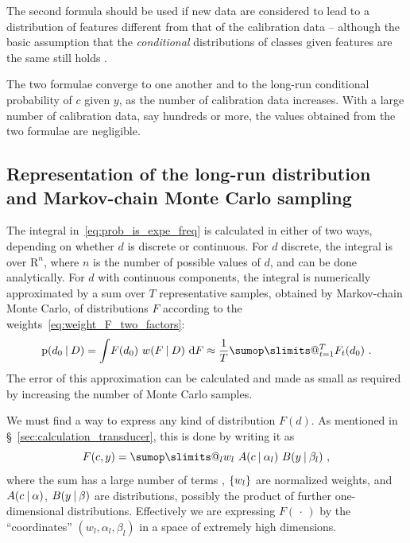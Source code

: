 \documentclass[\ifafour a4paper,12pt,\else a5paper,10pt,\fi%
onecolumn,oneside,article,%
british%
]{memoir}
\makeatletter
\theoremstyle{remark}
\theoremstyle{innote}
\def\sum{\DOTSI\sumop\slimits@}
\newcommand*{\wrench}{{\fontencoding{U}\fontfamily{fontawesomethree}\selectfont\symbol{114}}}
\newcommand{\mynotew}[1]{{\footnotesize\color{notecolour}\wrench\ #1}}
\newcommand*{\di}{\mathrm{d}}%
\newcommand*{\RR}{\bm{\mathrm{R}}}
\newcommand*{\dotv}{\mathord{\,\cdot\,}}%
\DeclarePairedDelimiter\set{\{}{\}} %
\newcommand*{\p}{\mathrm{p}}%
\renewcommand*{\|}[1][]{\nonscript\:#1\vert\nonscript\:\mathopen{}}
\newcommand*{\sect}{\S}%
\newcommand*{\wf}{w}
\makeatother
\begin{document}
The second formula should be used if new data are considered to lead to a  distribution of features different from that of the calibration data -- although the basic assumption that the \emph{conditional} distributions of classes given features are the same still holds \autocites[see][for a thorough discussion of these two cases]{lindleyetal1981}.

The two formulae converge to one another and to the long-run conditional probability of $c$ given $y$, as the number of calibration data increases. With a large number of calibration data, say hundreds or more, the values obtained from the two formulae are negligible.

\subsection{Representation of the long-run distribution and Markov-chain Monte Carlo sampling}
\label{sec:MCMC}

The integral in~\eqref{eq:prob_is_expe_freq} is calculated in either of two ways, depending on whether $d$ is discrete or continuous. For $d$ discrete, the integral is over $\RR^{n}$, where $n$ is the number of possible values of $d$, and can be done analytically. For $d$ with continuous components, the integral is numerically approximated by a sum over $T$ representative samples, obtained by Markov-chain Monte Carlo, of distributions $F$ according to the weights~\eqref{eq:weight_F_two_factors}:
\begin{equation}
  \label{eq:MC_approx}
  \p(d_{0} \| D) = \int\! F(d_{0})\ \wf(F \| D)\ \di F
  \approx
\frac{1}{T}\sum_{t=1}^{T} F_{t}(d_{0}) \ .  
\end{equation}
The error of this approximation can be calculated and made as small as required by increasing the number of Monte Carlo samples.


We must find a way to express any kind of distribution $F(d)$. As mentioned in \sect~\ref{sec:calculation_transducer}, this is done by writing it as
\begin{equation}
  \label{eq:representation_F}
  F(c, y) = \sum_{l} w_{l}\ A(c \| \alpha_{l})\ B(y \| \beta_{l}) \ ,
\end{equation}
where the sum has a large number of terms \autocites[see][on why the number of terms does not need to be infinite]{ishwaranetal2002b}, $\set{w_{l}}$ are normalized weights, and $A(c\|\alpha)$, $B(y \| \beta)$ are distributions, possibly the product of further one-dimensional distributions. Effectively we are expressing $F(\dotv)$ by the \enquote{coordinates} $(w_{l}, \alpha_{l}, \beta_{l})$ in a space of extremely high dimensions.
\end{document}
